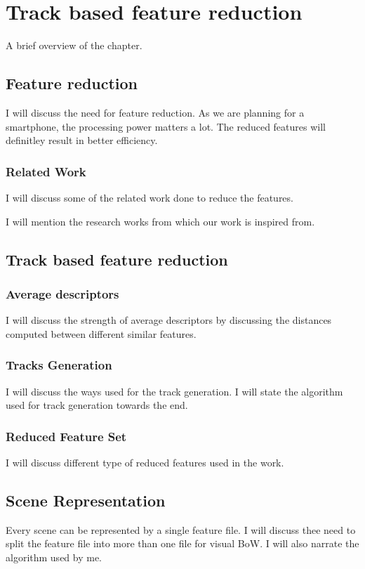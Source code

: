 \chapter{Track based feature reduction}

A brief overview of the chapter.

\section{Feature reduction}
I will discuss the need for feature reduction. 
As we are planning for a smartphone, 
the processing power matters a lot. 
The reduced features will definitley 
result in better efficiency.
 
\subsection{Related Work}
I will discuss some of the related work 
done to reduce the features.

I will mention the research works from 
which our work is inspired from.


\section{Track based feature reduction}

\subsection{Average descriptors}
I will discuss the strength of average descriptors 
by discussing the distances computed between 
different similar features.

\subsection{Tracks Generation}
I will discuss the ways used for the track generation.
I will state the algorithm used for track generation 
towards the end.
 
\subsection{Reduced Feature Set}
I will discuss different type of reduced features used 
in the work.

\section{Scene Representation}
Every scene can be represented by a 
single feature file. I will discuss thee need 
to split the feature file 
into more than one file for visual BoW.
I will also narrate the algorithm used by me.


